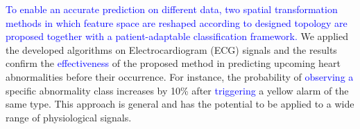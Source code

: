 \textcolor{blue}{To enable an accurate prediction on different data, two spatial transformation methods in which feature space are reshaped according to designed topology are proposed together with a patient-adaptable classification framework.} %
We applied the developed algorithms on Electrocardiogram (ECG) signals and the results confirm the \textcolor{blue}{effectiveness} of the proposed method in predicting upcoming heart abnormalities before their occurrence. For instance, the probability of \textcolor{blue}{observing a} specific abnormality class increases by 10\% after \textcolor{blue}{triggering} a yellow alarm of the same type. This approach is general and has the potential to be applied to a wide range of physiological signals.


